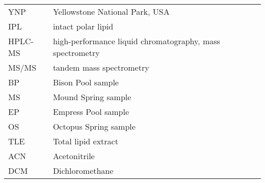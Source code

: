 \begin{tabular}{ l l }
YNP & Yellowstone National Park, USA\\
IPL & intact polar lipid\\
HPLC-MS & high-performance liquid chromatography, mass spectrometry\\
MS/MS & tandem mass spectrometry\\
BP & Bison Pool sample\\
MS & Mound Spring sample\\
EP & Empress Pool sample\\
OS & Octopus Spring sample\\
TLE & Total lipid extract\\
ACN & Acetonitrile\\
DCM & Dichloromethane\\
\end{tabular}


    


\doublespace